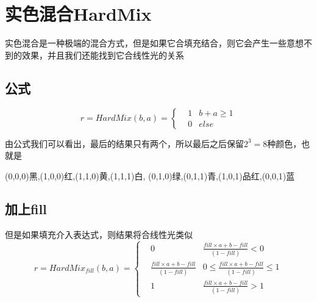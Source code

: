 %
%

\newpage
\section{ 实色混合HardMix}

实色混合是一种极端的混合方式，但是如果它合填充结合，则它会产生一些意想不到的效果，并且我们还能找到它合线性光的关系

\subsection{ 公式}
\begin{equation}r=HardMix(b,a)=\left\{ \begin{aligned}&1&b+a\geq 1\\&0&else  \end{aligned}\right.\end{equation}

由公式我们可以看出，最后的结果只有两个，所以最后之后保留$2^3=8$种颜色，也就是

	 (0,0,0)黑,(1,0,0)红,(1,1,0)黄,(1,1,1)白,
	 (0,1,0)绿,(0,1,1)青,(1,0,1)品红,(0,0,1)蓝
\subsection{ 加上fill}
但是如果填充介入表达式，则结果将合线性光类似
\begin{equation}r=HardMix_{fill}(b,a)=\left\{ \begin{aligned}&0&  \frac{fill\times a+b-fill}{(1-fill)}<0\\ &\frac{fill\times a+b-fill}{(1-fill)}&0\leq \frac{fill\times a+b-fill}{(1-fill)}\leq 1\\ &1&  \frac{fill\times a+b-fill}{(1-fill)}>1 \end{aligned}\right.\end{equation}

